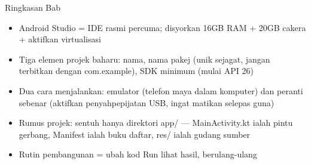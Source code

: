 \begin{tcbsummary}{Ringkasan Bab}
\begin{itemize}
  \item Android Studio = IDE rasmi percuma; disyorkan 16GB RAM + 20GB cakera + aktifkan virtualisasi
  \item Tiga elemen projek baharu: nama, nama pakej (unik sejagat, jangan terbitkan dengan com.example), SDK minimum (mulai API 26)
  \item Dua cara menjalankan: emulator (telefon maya dalam komputer) dan peranti sebenar (aktifkan penyahpepijatan USB, ingat matikan selepas guna)
  \item Rumus projek: sentuh hanya direktori app/ — MainActivity.kt ialah pintu gerbang, Manifest ialah buku daftar, res/ ialah gudang sumber
  \item Rutin pembangunan = ubah kod Run lihat hasil, berulang-ulang
\end{itemize}

\end{tcbsummary}
